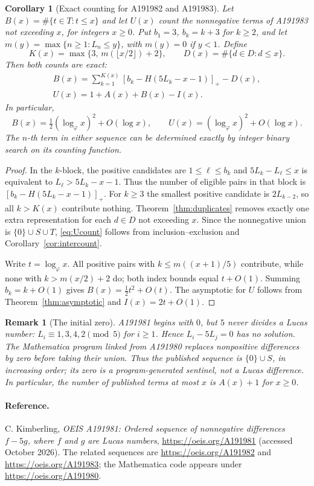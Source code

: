 \documentclass[11pt]{article}
\newtheorem{corollary}[theorem]{Corollary}
\newtheorem{remark}[theorem]{Remark}
\begin{document}
\begin{corollary}[Exact counting for A191982 and A191983]
\label{cor:union}
Let $B(x)=\#\{t\in T:t\le x\}$ and let $U(x)$ count the
nonnegative terms of A191983 not exceeding $x$, for
integers $x\ge0$. Put $b_1=3$, $b_k=k+3$ for $k\ge2$,
and let $m(y)=\max\{n\ge1:L_n\le y\}$, with $m(y)=0$ if
$y<1$. Define
\[
K(x)=\max\{3,\,m(\lfloor x/2\rfloor)+2\},\qquad
D(x)=\#\{d\in D:d\le x\}.
\]
Then both counts are exact:
\begin{align}
\boxed{\displaystyle
 B(x)=\sum_{k=1}^{K(x)}
 \left[b_k-H(5L_k-x-1)\right]_+-D(x),}
 \label{eq:Tcount}\\
\boxed{\displaystyle U(x)=1+A(x)+B(x)-I(x).}
\label{eq:Ucount}
\end{align}
In particular,
\[
B(x)=\tfrac12(\log_\varphi x)^2+O(\log x),\qquad
U(x)=(\log_\varphi x)^2+O(\log x).
\]
The $n$-th term in either sequence can be determined
exactly by integer binary search on its counting function.
\end{corollary}
\begin{proof}
In the $k$-block, the positive candidates are
$1\le\ell\le b_k$ and
$5L_k-L_\ell\le x$ is equivalent to
$L_\ell>5L_k-x-1$.
Thus the number of eligible pairs in that block is
$[b_k-H(5L_k-x-1)]_+$.
For $k\ge3$ the smallest positive candidate is $2L_{k-2}$,
so all $k>K(x)$ contribute nothing.
Theorem~\ref{thm:duplicates} removes exactly one
extra representation for each $d\in D$ not exceeding $x$.
Since the nonnegative union is $\{0\}\cup S\cup T$,
\eqref{eq:Ucount} follows from inclusion--exclusion and
Corollary~\ref{cor:intercount}.

Write $t=\log_\varphi x$.
All positive pairs with $k\le m((x+1)/5)$ contribute,
while none with $k>m(x/2)+2$ do; both index bounds equal
$t+O(1)$. Summing $b_k=k+O(1)$ gives
$B(x)=\frac12t^2+O(t)$.
The asymptotic for $U$ follows from
Theorem~\ref{thm:asymptotic} and
$I(x)=2t+O(1)$.
\end{proof}

\begin{remark}[The initial zero]
A191981 begins with $0$, but $5$ never divides a Lucas number: $L_i\equiv1,3,4,2\pmod5$ for $i\ge1$. Hence $L_i-5L_j=0$ has no solution. The Mathematica program linked from A191980 replaces nonpositive differences by zero before taking their union. Thus the published sequence is $\{0\}\cup S$, in increasing order; its zero is a program-generated sentinel, not a Lucas difference. In particular, the number of published terms at most $x$ is $A(x)+1$ for $x\ge0$.
\end{remark}

\paragraph{Reference.}
C. Kimberling, \emph{OEIS A191981: Ordered sequence of nonnegative differences $f-5g$, where $f$ and $g$ are Lucas numbers}, \url{https://oeis.org/A191981} (accessed October 2026). The related sequences are \url{https://oeis.org/A191982} and \url{https://oeis.org/A191983}; the Mathematica code appears under \url{https://oeis.org/A191980}.
\end{document}
